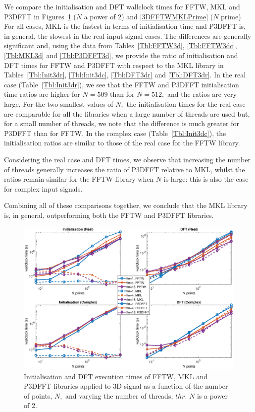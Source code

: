 \documentclass[a4paper]{article}
\begin{document}
We compare the initialisation and DFT wallclock times for FFTW, MKL
and P3DFFT in Figures~\ref{3DFFTWMKL2} ($N$ a power of 2) and
\ref{3DFFTWMKLPrime} ($N$ prime). For all cases, MKL is the fastest in
terms of initialisation time and P3DFFT is, in general, the slowest in
the real input signal cases. The differences are generally significant
and, using the data from Tables~\ref{Tbl:FFTW3d}, \ref{Tbl:FFTW3dc}, \ref{Tbl:MKL3d} and
\ref{Tbl:P3DFFT3d}, we provide the ratio of initialisation and DFT
times for FFTW and P3DFFT with respect to the MKL library in
Tables~\ref{Tbl:Init3dr}, \ref{Tbl:Init3dc}, \ref{Tbl:DFT3dr} and
\ref{Tbl:DFT3dr}. In the real case (Table~\ref{Tbl:Init3dr}), we see
that the FFTW and P3DFFT initialisation time ratios are higher for
$N=509$ than for $N=512,$ and the ratios are very large. For the two
smallest values of $N,$ the initialisation times for the real case are
comparable for all the libraries when a large number of threads are
used but, for a small number of threads, we note that the difference
is much greater for P3DFFT than for FFTW. In the complex case
(Table~\ref{Tbl:Init3dc}), the initialisation ratios are similar to
those of the real case for the FFTW library.

Considering the real case and DFT times, we observe that increasing
the number of threads generally increases the ratio of P3DFFT relative
to MKL, whilst the ratios remain similar for the FFTW library when $N$ is
large: this is also the case for complex input signals.

Combining all of these comparisons together, we conclude that the MKL
library is, in general, outperforming both the FFTW and P3DFFT
libraries.




\begin{figure}[htb]
    \centering
    \includegraphics[width=0.9\linewidth]{../results/fftw_mkl_p3dfft_2_3d_thr.eps}
  \caption{Initialisation and DFT execution times of FFTW, MKL and P3DFFT libraries applied to 3D signal as a function of the
    number of points, $N,$ and varying the number of threads, $thr.$ $N$ is a power of 2.}
  \label{3DFFTWMKL2}
\end{figure}
\end{document}
